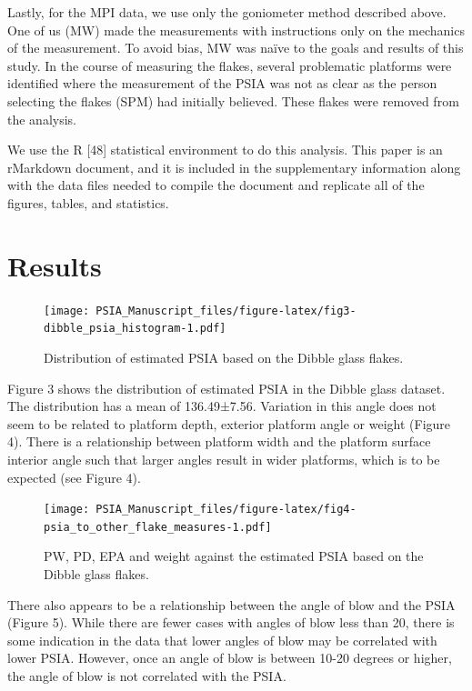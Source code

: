 \documentclass[10pt,letterpaper]{article}
\begin{document}
Lastly, for the MPI data, we use only the goniometer method described
above. One of us (MW) made the measurements with instructions only on
the mechanics of the measurement. To avoid bias, MW was naïve to the
goals and results of this study. In the course of measuring the flakes,
several problematic platforms were identified where the measurement of
the PSIA was not as clear as the person selecting the flakes (SPM) had
initially believed. These flakes were removed from the analysis.

We use the R {[}48{]} statistical environment to do this analysis. This
paper is an rMarkdown document, and it is included in the supplementary
information along with the data files needed to compile the document and
replicate all of the figures, tables, and statistics.

\hypertarget{results}{%
\section{Results}\label{results}}

\begin{figure}
\centering
\texttt{[image: PSIA\_Manuscript\_files/figure-latex/fig3-dibble\_psia\_histogram-1.pdf]}
\caption{Distribution of estimated PSIA based on the Dibble glass
flakes.}
\end{figure}

Figure 3 shows the distribution of estimated PSIA in the Dibble glass
dataset. The distribution has a mean of 136.49±7.56. Variation in this
angle does not seem to be related to platform depth, exterior platform
angle or weight (Figure 4). There is a relationship between platform
width and the platform surface interior angle such that larger angles
result in wider platforms, which is to be expected (see Figure 4).

\begin{figure}
\centering
\texttt{[image: PSIA\_Manuscript\_files/figure-latex/fig4-psia\_to\_other\_flake\_measures-1.pdf]}
\caption{PW, PD, EPA and weight against the estimated PSIA based on the
Dibble glass flakes.}
\end{figure}

There also appears to be a relationship between the angle of blow and
the PSIA (Figure 5). While there are fewer cases with angles of blow
less than 20, there is some indication in the data that lower angles of
blow may be correlated with lower PSIA. However, once an angle of blow
is between 10-20 degrees or higher, the angle of blow is not correlated
with the PSIA.
\end{document}
